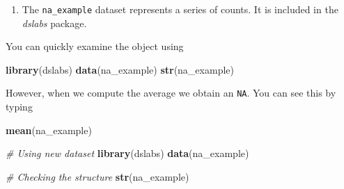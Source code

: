 \documentclass[]{article}
\newenvironment{Shaded}{\begin{snugshade}}{\end{snugshade}}
\newcommand{\CommentTok}[1]{\textcolor[rgb]{0.56,0.35,0.01}{\textit{#1}}}
\newcommand{\DataTypeTok}[1]{\textcolor[rgb]{0.13,0.29,0.53}{#1}}
\newcommand{\KeywordTok}[1]{\textcolor[rgb]{0.13,0.29,0.53}{\textbf{#1}}}
\newcommand{\NormalTok}[1]{#1}
\newcommand{\OperatorTok}[1]{\textcolor[rgb]{0.81,0.36,0.00}{\textbf{#1}}}
\newcommand{\StringTok}[1]{\textcolor[rgb]{0.31,0.60,0.02}{#1}}
\providecommand{\tightlist}{%
  \setlength{\itemsep}{0pt}\setlength{\parskip}{0pt}}
\begin{document}
\begin{Shaded}
\end{Shaded}

\begin{enumerate}
\def\labelenumi{\arabic{enumi}.}
\setcounter{enumi}{6}
\tightlist
\item
  The \texttt{na\_example} dataset represents a series of counts. It is
  included in the \emph{dslabs} package.
\end{enumerate}

You can quickly examine the object using

\begin{Shaded}
\begin{Highlighting}[]
\KeywordTok{library}\NormalTok{(dslabs)}
\KeywordTok{data}\NormalTok{(na_example)}
\KeywordTok{str}\NormalTok{(na_example)}
\end{Highlighting}
\end{Shaded}

However, when we compute the average we obtain an \texttt{NA}. You can
see this by typing

\begin{Shaded}
\begin{Highlighting}[]
\KeywordTok{mean}\NormalTok{(na_example)}
\end{Highlighting}
\end{Shaded}

\begin{Shaded}
\begin{Highlighting}[]
\CommentTok{# Using new dataset }
\KeywordTok{library}\NormalTok{(dslabs)}
\KeywordTok{data}\NormalTok{(na_example)}

\CommentTok{# Checking the structure }
\KeywordTok{str}\NormalTok{(na_example)}
\end{Highlighting}
\end{Shaded}
\end{document}
